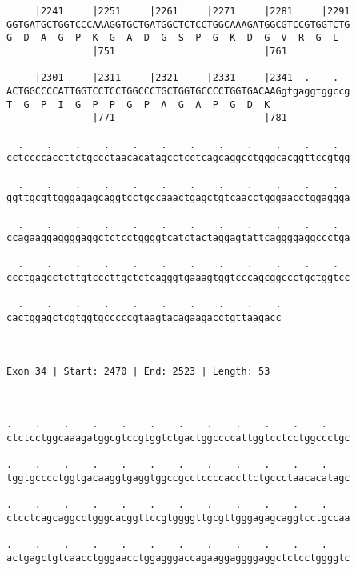\documentclass{article}
\begin{document}
\begin{Verbatim}
     |2241     |2251     |2261     |2271     |2281     |2291
GGTGATGCTGGTCCCAAAGGTGCTGATGGCTCTCCTGGCAAAGATGGCGTCCGTGGTCTG
G  D  A  G  P  K  G  A  D  G  S  P  G  K  D  G  V  R  G  L  
               |751                          |761           
  
     |2301     |2311     |2321     |2331     |2341  .    .  
ACTGGCCCCATTGGTCCTCCTGGCCCTGCTGGTGCCCCTGGTGACAAGgtgaggtggccg
T  G  P  I  G  P  P  G  P  A  G  A  P  G  D  K              
               |771                          |781           
  
  .    .    .    .    .    .    .    .    .    .    .    .  
cctccccaccttctgccctaacacatagcctcctcagcaggcctgggcacggttccgtgg
                                                            
  .    .    .    .    .    .    .    .    .    .    .    .  
ggttgcgttgggagagcaggtcctgccaaactgagctgtcaacctgggaacctggaggga
                                                            
  .    .    .    .    .    .    .    .    .    .    .    .  
ccagaaggaggggaggctctcctggggtcatctactaggagtattcaggggaggccctga
                                                            
  .    .    .    .    .    .    .    .    .    .    .    .  
ccctgagcctcttgtcccttgctctcagggtgaaagtggtcccagcggccctgctggtcc
                                                            
  .    .    .    .    .    .    .    .    .    .
cactggagctcgtggtgcccccgtaagtacagaagacctgttaagacc
                                                
                                                
 
Exon 34 | Start: 2470 | End: 2523 | Length: 53



.    .    .    .    .    .    .    .    .    .    .    .    
ctctcctggcaaagatggcgtccgtggtctgactggccccattggtcctcctggccctgc
                                                            
.    .    .    .    .    .    .    .    .    .    .    .    
tggtgcccctggtgacaaggtgaggtggccgcctccccaccttctgccctaacacatagc
                                                            
.    .    .    .    .    .    .    .    .    .    .    .    
ctcctcagcaggcctgggcacggttccgtggggttgcgttgggagagcaggtcctgccaa
                                                            
.    .    .    .    .    .    .    .    .    .    .    .    
actgagctgtcaacctgggaacctggagggaccagaaggaggggaggctctcctggggtc
                                                            

\end{Verbatim}
\end{document}
